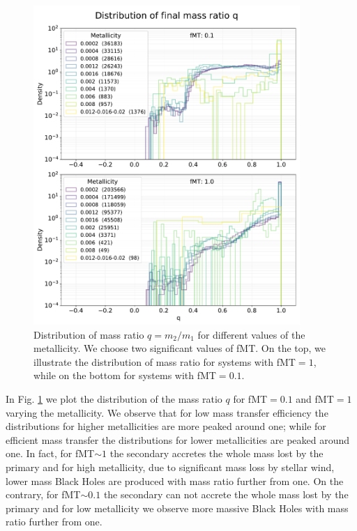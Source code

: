 \documentclass[prb,twocolumn,9pt]{revtex4-1}
\begin{document}
\begin{figure}[!t]
    \begin{minipage}[l]{1.0\columnwidth}
    \centering
    \includegraphics[width=0.9\textwidth]{images/assignment1/mass_ratio_2.pdf}
    \caption{Distribution of mass ratio \(q=m_2/m_1\) for different values of the metallicity. We choose two significant values of fMT.
    On the top, we illustrate the distribution of mass ratio for systems with fMT\(=1\), while on the bottom for systems with fMT\(=0.1\). 
    }
    \label{fig:ass1_histq}
    \end{minipage}
\end{figure}

In Fig. \ref{fig:ass1_histq} we plot the distribution of the mass ratio \(q\) for fMT\(=0.1\) and fMT\(=1\) varying the metallicity. We observe that for low mass transfer efficiency the distributions for higher metallicities are more peaked around one; while for efficient mass transfer the distributions for lower metallicities are peaked around one. In fact, for fMT\(\sim 1\) the secondary accretes the whole mass lost by the primary and for high metallicity, due to significant mass loss by stellar wind, lower mass Black Holes are produced with mass ratio further from one. On the contrary, for fMT\(\sim 0.1\) the secondary can not accrete the whole mass lost by the primary and for low metallicity we observe more massive Black Holes with mass ratio further from one.
\end{document}
